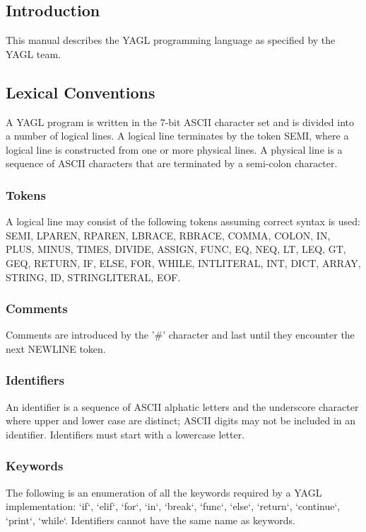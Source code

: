 \documentclass[12pt]{article}
\begin{document}
\subsection{Introduction}
This manual describes the YAGL programming language as specified by the YAGL team. 

\subsection{Lexical Conventions}
A YAGL program is written in the 7-bit ASCII character set and is divided into a number of logical lines. A logical line terminates by the token SEMI, where a logical line is constructed from one or more physical lines. A physical line is a sequence of ASCII characters that are terminated by a semi-colon character.

\subsubsection{Tokens}
A logical line may consist of the following tokens assuming correct syntax is used: \\
SEMI, LPAREN, RPAREN, LBRACE, RBRACE, COMMA, COLON, IN, PLUS, MINUS, TIMES, DIVIDE, ASSIGN, FUNC, EQ, NEQ, LT, LEQ, GT, GEQ, RETURN, IF, ELSE, FOR, WHILE, INTLITERAL, INT, DICT, ARRAY, STRING, ID, STRINGLITERAL, EOF.

\subsubsection{Comments} 
Comments are introduced by the '\#' character and last until they encounter the next NEWLINE token.

\subsubsection{Identifiers}
An identifier is a sequence of ASCII alphatic letters and the underscore character where upper and lower case are distinct; ASCII digits may not be included in an identifier.  Identifiers must start with a lowercase letter.

\subsubsection{Keywords}
The following is an enumeration of all the keywords required by a YAGL implementation:
`if`, `elif`, `for`, `in`, `break`, `func`, `else`, `return`, `continue`, `print`, `while`.  Identifiers cannot have the same name as keywords.
\end{document}
